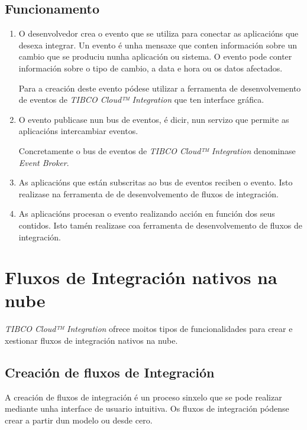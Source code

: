 \subsection{Funcionamento}

\begin{enumerate}
    \item O desenvolvedor crea o evento que se utiliza para conectar as aplicacións que desexa integrar. Un evento é unha mensaxe que conten información sobre un cambio que se produciu nunha aplicación ou sistema. O evento pode conter información sobre o tipo de cambio, a data e hora ou os datos afectados.
    
    Para a creación deste evento pódese utilizar a ferramenta de desenvolvemento de eventos de \textit{TIBCO Cloud™ Integration} que ten interface gráfica.
    
    \item O evento publicase nun bus de eventos, é dicir, nun servizo que permite as aplicacións intercambiar eventos.
    
    Concretamente o bus de eventos de \textit{TIBCO Cloud™ Integration} denominase \textit{Event Broker}.
    
    \item As aplicacións que están subscritas ao bus de eventos reciben o evento. Isto realizase na ferramenta de de desenvolvemento de fluxos de integración.
    
    \item As aplicacións procesan o evento realizando acción en función dos seus contidos. Isto tamén realizase coa ferramenta de desenvolvemento de fluxos de integración.
\end{enumerate}

\section{Fluxos de Integración nativos na nube}

\textit{TIBCO Cloud™ Integration} ofrece moitos tipos de funcionalidades para crear e xestionar fluxos de integración nativos na nube.

\subsection{Creación de fluxos de Integración}

A creación de fluxos de integración é un proceso sinxelo que se pode realizar mediante unha interface de usuario intuitiva. Os fluxos de integración pódense crear a partir dun modelo ou desde cero.


